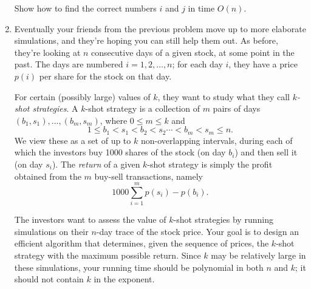 \documentclass[12pt]{article}
\begin{document}
\begin{enumerate}
Show how to find the correct numbers $i$ and $j$ in time $O(n)$.




\item

Eventually your friends from the previous problem move up to
more elaborate simulations, and they're hoping you can still help
them out.
As before, they're looking
at $n$ consecutive days of a given stock,
at some point in the past.
The days are numbered $i = 1, 2, \ldots, n$;
for each day $i$, they have a price $p(i)$ per
share for the stock on that day.

For certain (possibly large) values of $k$, they want to
study what they call {\em $k$-shot strategies}.
A $k$-shot strategy is a collection of $m$
pairs of days $(b_1, s_1), \ldots, (b_m, s_m)$,
where $0 \leq m \leq k$ and
$$1 \leq b_1 < s_1 < b_2 < s_2 \cdots < b_m < s_m \leq n.$$
We view these as a set of up to $k$ non-overlapping intervals,
during each of which the investors buy 1000 shares of the stock
(on day $b_i$) and then sell it (on day $s_i$).
The {\em return} of a given $k$-shot strategy
is simply the profit obtained from the $m$ buy-sell transactions,
namely
$$1000 \sum_{i=1}^m p(s_i) - p(b_i).$$

The investors want to assess the value of $k$-shot strategies
by running simulations on their $n$-day trace of the stock price.
Your goal is to design an efficient algorithm that
determines, given the sequence of prices,
the $k$-shot strategy with the maximum possible return.
Since $k$ may be relatively large in these simulations,
your running time should be polynomial in both $n$ and $k$;
it should not contain $k$ in the exponent.

\end{enumerate}
\end{document}
